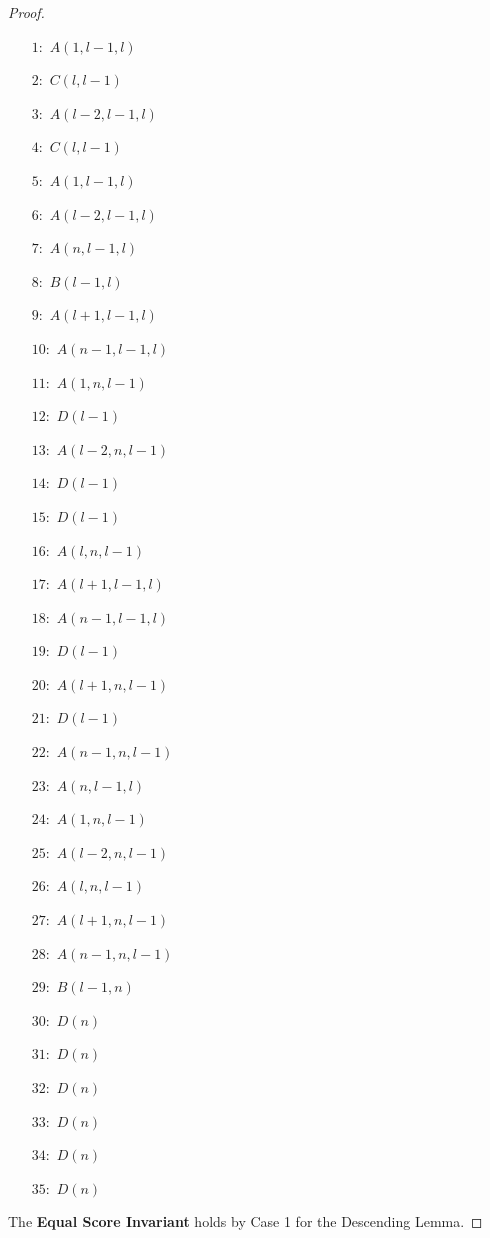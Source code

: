 \documentclass[a4paper,UKenglish,cleveref, autoref, thm-restate]{lipics-v2021}
\begin{document}
\begin{proof}
\begin{minipage}[t]{0.3\textwidth}
\begin{enumerate}
\item[$1:$] $A(1, l - 1, l)$
\item[$2:$] $C(l, l - 1)$
\item[$3:$] $A(l - 2, l - 1, l)$
\item[$4:$] $C(l, l - 1)$
\item[$5:$] $A(1, l - 1, l)$
\item[$6:$] $A(l - 2, l - 1, l)$
\item[$7:$] $A(n, l - 1, l)$
\item[$8:$] $B(l - 1, l)$
\item[$9:$] $A(l + 1, l - 1, l)$
\item[$10:$] $A(n - 1, l - 1, l)$
\item[$11:$] $A(1, n, l - 1)$
\item[$12:$] $D(l - 1)$
\end{enumerate}
\end{minipage}
\hfill
\begin{minipage}[t]{0.3\textwidth}
\begin{enumerate}
\item[$13:$] $A(l - 2, n, l - 1)$
\item[$14:$] $D(l - 1)$
\item[$15:$] $D(l - 1)$
\item[$16:$] $A(l, n, l - 1)$
\item[$17:$] $A(l + 1, l - 1, l)$
\item[$18:$] $A(n - 1, l - 1, l)$
\item[$19:$] $D(l - 1)$
\item[$20:$] $A(l + 1, n, l - 1)$
\item[$21:$] $D(l - 1)$
\item[$22:$] $A(n - 1, n, l - 1)$
\item[$23:$] $A(n, l - 1, l)$
\item[$24:$] $A(1, n, l - 1)$
\end{enumerate}
\end{minipage}
\begin{minipage}[t]{0.3\textwidth}
\begin{enumerate}
\item[$25:$] $A(l - 2, n, l - 1)$
\item[$26:$] $A(l, n, l - 1)$
\item[$27:$] $A(l + 1, n, l - 1)$
\item[$28:$] $A(n - 1, n, l - 1)$
\item[$29:$] $B(l - 1, n)$
\item[$30:$] $D(n)$
\item[$31:$] $D(n)$
\item[$32:$] $D(n)$
\item[$33:$] $D(n)$
\item[$34:$] $D(n)$
\item[$35:$] $D(n)$
\end{enumerate}
\end{minipage}
\noindent The \textbf{Equal Score Invariant} holds by Case 1 for the Descending Lemma.


\end{proof}
\end{document}
